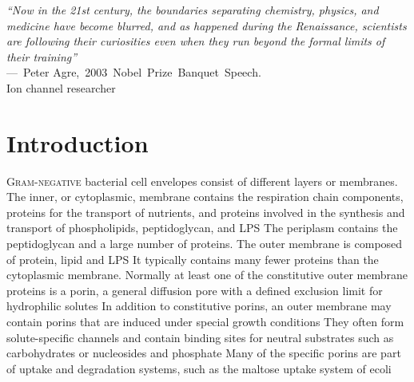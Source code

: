 \acresetall
{}
\begin{epigraph}
\emph{``Now in the 21st century, the boundaries separating chemistry, physics, and medicine have become blurred, and as happened during the Renaissance, scientists are following their curiosities even when they run beyond the formal limits of their training''}\\---~Peter Agre,~2003~Nobel~Prize~Banquet~Speech.\\  Ion channel researcher
\end{epigraph}

\section{Introduction} %
\label{sec:porin_introduction} 
\lettrine[lines=2]{G}{ram-negative} bacterial cell envelopes consist of
different layers or membranes. The inner, or cytoplasmic, membrane contains the
respiration chain components, proteins for the transport of nutrients, and
proteins involved in the synthesis and transport of phospholipids, peptidoglycan, and \ac{LPS}  The periplasm contains the peptidoglycan and a large number of proteins. The outer membrane is composed of protein, lipid and \ac{LPS} It typically contains many  fewer proteins than the cytoplasmic membrane. Normally at least one of the constitutive outer membrane proteins is a porin, a general diffusion pore with a defined exclusion limit for hydrophilic solutes In addition to constitutive porins, an outer membrane may contain porins that are induced under special growth conditions They often form solute-specific channels and contain binding sites for neutral substrates such as carbohydrates or nucleosides and phosphate Many of the specific porins are part of uptake and degradation systems, such as the maltose uptake system of \acl{ecoli} 

